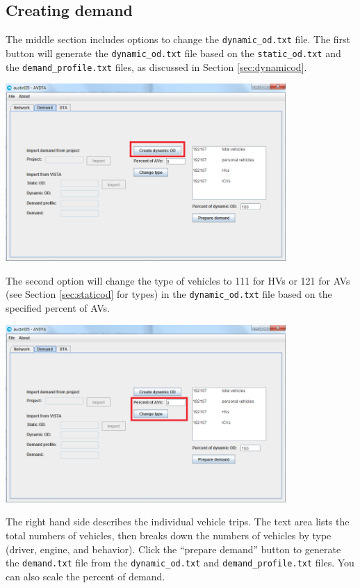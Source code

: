 \subsection{Creating demand}
The middle section includes options to change the \texttt{dynamic\_od.txt} file. The first button will generate the \texttt{dynamic\_od.txt} file based on the \texttt{static\_od.txt} and the \texttt{demand\_profile.txt} files, as discussed in Section \ref{sec:dynamicod}. 
\begin{center}
\includegraphics[width=0.8\textwidth]{images/demand3.png}
\end{center}

The second option will change the type of vehicles to 111 for HVs or 121 for AVs (see Section \ref{sec:staticod} for types) in the \texttt{dynamic\_od.txt} file based on the specified percent of AVs. 
\begin{center}
\includegraphics[width=0.8\textwidth]{images/demand3b.png}
\end{center}

The right hand side describes the individual vehicle trips. The text area lists the total numbers of vehicles, then breaks down the numbers of vehicles by type (driver, engine, and behavior). Click the ``prepare demand'' button to generate the \texttt{demand.txt} file from the \texttt{dynamic\_od.txt} and \texttt{demand\_profile.txt} files. You can also scale the percent of demand. 

